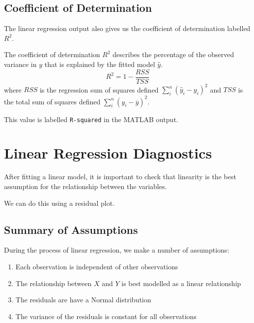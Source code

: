 \documentclass{article}
\begin{document}
\subsection{Coefficient of Determination}
The linear regression output also gives us the coefficient of determination labelled \(R^2\).
\begin{definition}
    The coefficient of determination \(R^2\) describes the percentage of the observed variance
    in \(y\) that is explained by the fitted model \(\hat{y}\).
    \begin{equation*}
        R^2 = 1 - \frac{RSS}{TSS}
    \end{equation*}
    where \(RSS\) is the regression sum of squares defined
    \(\sum_i^n\left( \hat{y}_i - y_i \right)^2\) and \(TSS\) is the total sum
    of squares defined \(\sum_i^n \left( y_i - \overline{y} \right)^2\).
\end{definition}
This value is labelled \lstinline!R-squared! in the MATLAB output.
\section{Linear Regression Diagnostics}
After fitting a linear model, it is important to check that linearity is the best assumption for the relationship between the variables.

We can do this using a residual plot.
\subsection{Summary of Assumptions}
During the process of linear regression, we make a number of assumptions:
\begin{enumerate}
    \item Each observation is independent of other observations
    \item The relationship between \(X\) and \(Y\) is best modelled as a linear relationship
    \item The residuals are have a Normal distribution
    \item The variance of the residuals is constant for all observations
\end{enumerate}
\end{document}

